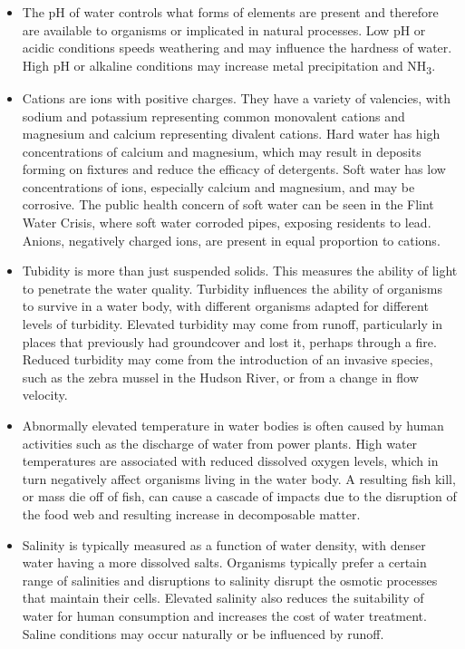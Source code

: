 \documentclass[
]{article}
\providecommand{\tightlist}{%
  \setlength{\itemsep}{0pt}\setlength{\parskip}{0pt}}
\begin{document}
\begin{itemize}
\tightlist
\item
  The pH of water controls what forms of elements are present and
  therefore are available to organisms or implicated in natural
  processes. Low pH or acidic conditions speeds weathering and may
  influence the hardness of water. High pH or alkaline conditions may
  increase metal precipitation and NH\textsubscript{3}.
\item
  Cations are ions with positive charges. They have a variety of
  valencies, with sodium and potassium representing common monovalent
  cations and magnesium and calcium representing divalent cations. Hard
  water has high concentrations of calcium and magnesium, which may
  result in deposits forming on fixtures and reduce the efficacy of
  detergents. Soft water has low concentrations of ions, especially
  calcium and magnesium, and may be corrosive. The public health concern
  of soft water can be seen in the Flint Water Crisis, where soft water
  corroded pipes, exposing residents to lead. Anions, negatively charged
  ions, are present in equal proportion to cations.
\item
  Tubidity is more than just suspended solids. This measures the ability
  of light to penetrate the water quality. Turbidity influences the
  ability of organisms to survive in a water body, with different
  organisms adapted for different levels of turbidity. Elevated
  turbidity may come from runoff, particularly in places that previously
  had groundcover and lost it, perhaps through a fire. Reduced turbidity
  may come from the introduction of an invasive species, such as the
  zebra mussel in the Hudson River, or from a change in flow velocity.
\item
  Abnormally elevated temperature in water bodies is often caused by
  human activities such as the discharge of water from power plants.
  High water temperatures are associated with reduced dissolved oxygen
  levels, which in turn negatively affect organisms living in the water
  body. A resulting fish kill, or mass die off of fish, can cause a
  cascade of impacts due to the disruption of the food web and resulting
  increase in decomposable matter.
\item
  Salinity is typically measured as a function of water density, with
  denser water having a more dissolved salts. Organisms typically prefer
  a certain range of salinities and disruptions to salinity disrupt the
  osmotic processes that maintain their cells. Elevated salinity also
  reduces the suitability of water for human consumption and increases
  the cost of water treatment. Saline conditions may occur naturally or
  be influenced by runoff.
\end{itemize}
\end{document}
